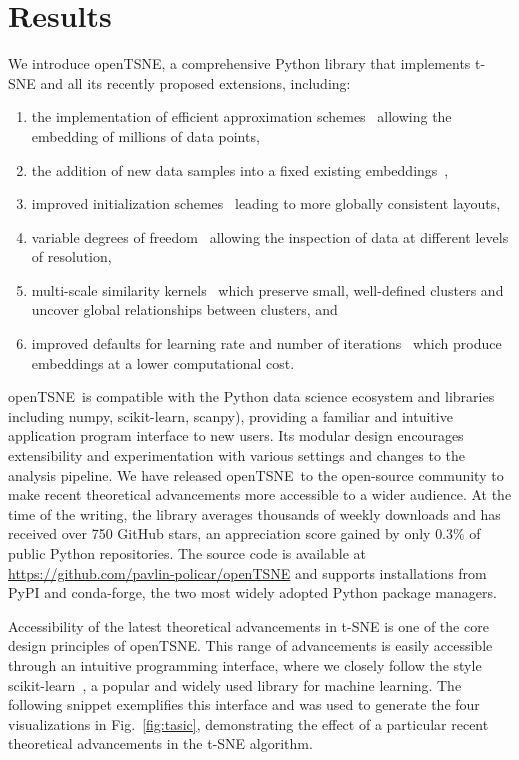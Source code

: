 \documentclass[twocolumn]{bmcart}
\newcommand{\opentsne}{\textsf{openTSNE}}
\begin{document}
\section*{Results}

We introduce \opentsne, a comprehensive Python library that implements t-SNE
and all its recently proposed extensions, including:
\begin{enumerate}
\item the implementation of efficient approximation 
  schemes~\cite{van2014accelerating,linderman2019fast} allowing the embedding
  of millions of data points,
\item the addition of new data samples into a fixed existing
  embeddings~\cite{policar2019embedding},
\item improved initialization schemes~\cite{kobak2019umap} leading to more
  globally consistent layouts,
\item variable degrees of freedom~\cite{kobak2019heavy} allowing the inspection
  of data at different levels of resolution,
\item multi-scale similarity kernels~\cite{kobak2019art} which preserve small,
  well-defined clusters and uncover global relationships between clusters,
  and
\item improved defaults for learning rate and number of
  iterations~\cite{belkina2019automated} which produce embeddings at a lower
  computational cost.
\end{enumerate}

\opentsne\ is compatible with the Python data science ecosystem and
libraries including \textsf{numpy}, \textsf{scikit-learn}, \textsf{scanpy}),
providing a familiar and intuitive application program interface to new
users. Its modular design encourages extensibility and experimentation with
various settings and changes to the analysis pipeline. We have released
\opentsne\ to the open-source community to make recent theoretical advancements
more accessible to a wider audience. At
the time of the writing, the library averages thousands of weekly
downloads and has received over 750 GitHub stars, an appreciation score gained
by only $0.3\%$ of public Python repositories. The source code is available at
\url{https://github.com/pavlin-policar/openTSNE} and supports installations from
\textsf{PyPI} and \textsf{conda-forge}, the two most widely adopted Python
package managers.

Accessibility of the latest theoretical advancements in t-SNE is one of the core
design principles of \opentsne. This range of advancements is easily accessible through an intuitive
programming interface, where we closely follow the style
\textsf{scikit-learn}~\cite{sklearn_api}, a popular and widely used
library for machine learning. The following snippet exemplifies this interface
and was used to generate the four visualizations in Fig.~\ref{fig:tasic}, demonstrating the
effect of a particular recent theoretical advancements in the t-SNE algorithm. 
\end{document}
